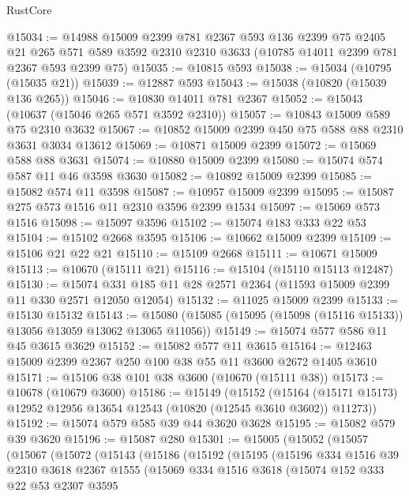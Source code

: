 \begin{lexlean}{RustCore}
\begin{coremodule}
@15034 := @14988
    @15009
    @2399
    @781
    @2367
    @593
    @136
    @2399
    @75
    @2405
    @21
    @265
    @571
    @589
    @3592
    @2310
    @2310
    @3633
    (@10785 @14011 @2399 @781 @2367 @593 @2399 @75)
@15035 := @10815 @593
@15038 := @15034 (@10795 (@15035 @21))
@15039 := @12887 @593
@15043 := @15038 (@10820 (@15039 @136 @265))
@15046 := @10830 @14011 @781 @2367
@15052 := @15043 (@10637 (@15046 @265 @571 @3592 @2310))
@15057 := @10843 @15009 @589 @75 @2310 @3632
@15067 := @10852 @15009 @2399 @450 @75 @588 @88 @2310 @3631 @3034 @13612
@15069 := @10871 @15009 @2399
@15072 := @15069 @588 @88 @3631
@15074 := @10880 @15009 @2399
@15080 := @15074 @574 @587 @11 @46 @3598 @3630
@15082 := @10892 @15009 @2399
@15085 := @15082 @574 @11 @3598
@15087 := @10957 @15009 @2399
@15095 := @15087 @275 @573 @1516 @11 @2310 @3596 @2399 @1534
@15097 := @15069 @573 @1516
@15098 := @15097 @3596
@15102 := @15074 @183 @333 @22 @53
@15104 := @15102 @2668 @3595
@15106 := @10662 @15009 @2399
@15109 := @15106 @21 @22 @21
@15110 := @15109 @2668
@15111 := @10671 @15009
@15113 := @10670 (@15111 @21)
@15116 := @15104 (@15110 @15113 @12487)
@15130 := @15074 @331 @185 @11 @28 @2571 @2364 (@11593 @15009 @2399 @11 @330 @2571 @12050 @12054)
@15132 := @11025 @15009 @2399
@15133 := @15130 @15132
@15143 := @15080 (@15085 (@15095 (@15098 (@15116 @15133)) @13056 @13059 @13062 @13065 @11056))
@15149 := @15074 @577 @586 @11 @45 @3615 @3629
@15152 := @15082 @577 @11 @3615
@15164 := @12463 @15009 @2399 @2367 @250 @100 @38 @55 @11 @3600 @2672 @1405 @3610
@15171 := @15106 @38 @101 @38 @3600 (@10670 (@15111 @38))
@15173 := @10678 (@10679 @3600)
@15186 := @15149
    (@15152
      (@15164 (@15171 @15173) @12952 @12956 @13654 @12543 (@10820 (@12545 @3610 @3602)) @11273))
@15192 := @15074 @579 @585 @39 @44 @3620 @3628
@15195 := @15082 @579 @39 @3620
@15196 := @15087 @280
@15301 := @15005
    (@15052
      (@15057
        (@15067
          (@15072
            (@15143
              (@15186
                (@15192
                  (@15195
                    (@15196
                      @334
                      @1516
                      @39
                      @2310
                      @3618
                      @2367
                      @1555
                      (@15069
                        @334
                        @1516
                        @3618
                        (@15074
                          @152
                          @333
                          @22
                          @53
                          @2307
                          @3595

\end{coremodule}
\end{lexlean}
